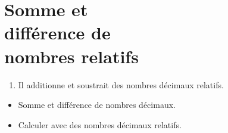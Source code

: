 \themaN
\graphicspath{{../../S20_Somme_et_difference_de_nombres_relatifs/Images/}}

   
\chapter{Somme et\\différence de\\nombres relatifs}
\label{S20}


\begin{autoeval}
   \small
   \begin{enumerate}
      \item Il additionne et soustrait des nombres décimaux relatifs.
   \end{enumerate}
\end{autoeval}

\begin{prerequis}
   \begin{itemize}
      \item Somme et différence de nombres décimaux.
      \item[\com] Calculer avec des nombres décimaux relatifs.
   \end{itemize}
\end{prerequis}

\vfill

